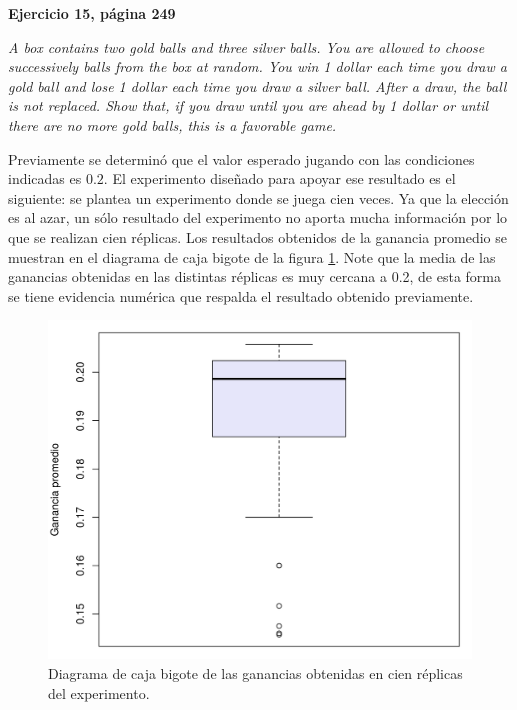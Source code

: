 \documentclass[12pt]{article}
\begin{document}
%	
%	
	
	
	{\bf Ejercicio 15, página 249}
	
	{\em A box contains two gold balls and three silver balls. You are allowed to choose successively balls from the box at random. You win 1 dollar each time you draw a gold ball and lose 1 dollar each time you draw a silver ball. After a draw, the ball is not replaced. Show that, if you draw until you are ahead by 1 dollar or until there are no more gold balls, this is a favorable game.}
	
	Previamente se determinó que el valor esperado jugando con las condiciones indicadas es $0.2$. El experimento diseñado para apoyar ese resultado es el siguiente: se plantea un experimento donde se juega cien veces. Ya que la elección es al azar, un sólo resultado del experimento no aporta mucha información por lo que se realizan cien réplicas. Los resultados obtenidos de la ganancia promedio se muestran en el diagrama de caja bigote de la figura \ref{pelotas}. Note que la media de las ganancias obtenidas en las distintas réplicas es muy cercana a 0.2, de esta forma se tiene evidencia numérica que respalda el resultado obtenido previamente.
	
	\begin{figure}
		\centering
		\includegraphics[scale=0.5]{pelotas.png}
		\caption{Diagrama de caja bigote de las ganancias obtenidas en cien réplicas del experimento.}
		\label{pelotas}
	\end{figure}
	
\end{document}
